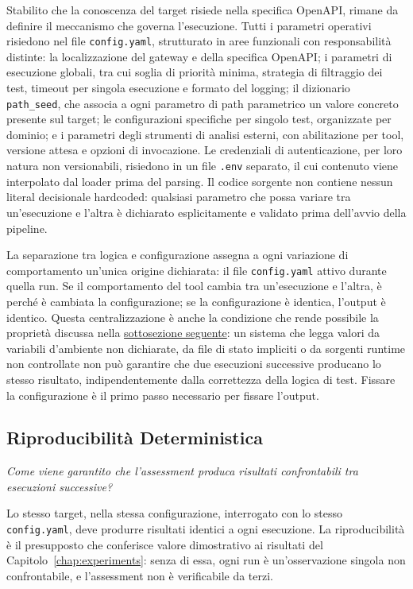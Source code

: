 Stabilito che la conoscenza del target risiede nella specifica OpenAPI, rimane da definire il meccanismo che governa l'esecuzione. Tutti i parametri operativi risiedono nel file \texttt{config.yaml}, strutturato in aree funzionali con responsabilità distinte: la localizzazione del gateway e della specifica OpenAPI; i parametri di esecuzione globali, tra cui soglia di priorità minima, strategia di filtraggio dei test, timeout per singola esecuzione e formato del logging; il dizionario \texttt{path\_seed}, che associa a ogni parametro di path parametrico un valore concreto presente sul target; le configurazioni specifiche per singolo test, organizzate per dominio; e i parametri degli strumenti di analisi esterni, con abilitazione per tool, versione attesa e opzioni di invocazione. Le credenziali di autenticazione, per loro natura non versionabili, risiedono in un file \texttt{.env} separato, il cui contenuto viene interpolato dal loader prima del parsing. Il codice sorgente non contiene nessun literal decisionale hardcoded: qualsiasi parametro che possa variare tra un'esecuzione e l'altra è dichiarato esplicitamente e validato prima dell'avvio della pipeline.

La separazione tra logica e configurazione assegna a ogni variazione di comportamento un'unica origine dichiarata: il file \texttt{config.yaml} attivo durante quella run. Se il comportamento del tool cambia tra un'esecuzione e l'altra, è perché è cambiata la configurazione; se la configurazione è identica, l'output è identico. Questa centralizzazione è anche la condizione che rende possibile la proprietà discussa nella \hyperref[subsec:reproducibility]{sottosezione seguente}: un sistema che legga valori da variabili d'ambiente non dichiarate, da file di stato impliciti o da sorgenti runtime non controllate non può garantire che due esecuzioni successive producano lo stesso risultato, indipendentemente dalla correttezza della logica di test. Fissare la configurazione è il primo passo necessario per fissare l'output.


\subsection{Riproducibilità Deterministica}\label{subsec:reproducibility}

\textit{Come viene garantito che l'assessment produca risultati confrontabili tra esecuzioni successive?}

Lo stesso target, nella stessa configurazione, interrogato con lo stesso \texttt{config.yaml}, deve produrre risultati identici a ogni esecuzione. La riproducibilità è il presupposto che conferisce valore dimostrativo ai risultati del Capitolo~\ref{chap:experiments}: senza di essa, ogni run è un'osservazione singola non confrontabile, e l'assessment non è verificabile da terzi.

